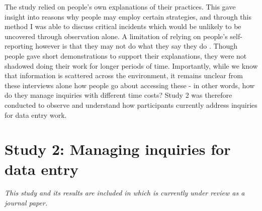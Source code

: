 The study relied on people's own explanations of their practices. This gave insight into reasons why people may employ certain strategies, and through this method I was able to discuss critical incidents which would be unlikely to be uncovered through observation alone. A limitation of relying on people's self-reporting however is that they may not do what they say they do \citep[e.g.][]{Randall2014}. Though people gave short demonstrations to support their explanations, they were not shadowed doing their work for longer periods of time. Importantly, while we know that information is scattered across the environment, it remains unclear from these interviews alone how people go about accessing these - in other words, how do they manage inquiries with different time costs? Study 2 was therefore conducted to observe and understand how participants currently address inquiries for data entry work.


\section{Study 2: Managing inquiries for data entry}\label{st:Study2}

\textit{This study and its results are included in \citet{Borghouts2018} which is currently under review as a journal paper.}

